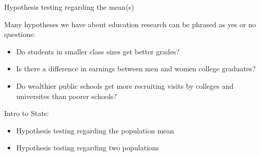 \documentclass[
  8pt,
  ignorenonframetext,
  dvipsnames]{beamer}
\providecommand{\tightlist}{%
  \setlength{\itemsep}{0pt}\setlength{\parskip}{0pt}}
\let\olditem\item
\renewcommand{\item}{%
  \olditem\vspace{4pt}
}
\begin{document}
\begin{frame}{Hypothesis testing regarding the mean(s)}
\protect\hypertarget{hypothesis-testing-regarding-the-means}{}

Many hypotheses we have about education research can be phrased as yes
or no questions:

\begin{itemize}
\tightlist
\item
  Do students in smaller class sizes get better grades?
\item
  Is there a difference in earnings between men and women college
  graduates?
\item
  Do wealthier public schools get more recruiting visits by colleges and
  universites than poorer schools?
\end{itemize}

\medskip

Intro to Stats:

\begin{itemize}
\tightlist
\item
  Hypothesis testing regarding the population mean
\item
  Hypothesis testing regarding two populations
\end{itemize}

\end{frame}
\end{document}

